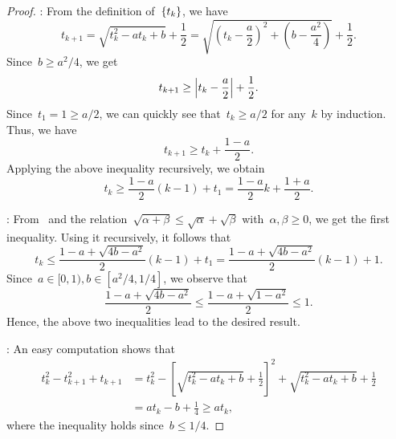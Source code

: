 \documentclass[../main]{subfiles}
\begin{document}
\begin{proof}
    :
    From the definition of~$\set{t_k}$, we have
    \begin{equation} \label{eq:t cs} 
        t_{k + 1} = \sqrt{t_k^2 - a t_k + b} + \frac{1}{2}
        = \sqrt{\left( t_k - \frac{a}{2} \right)^2 + \left( b - \frac{a^2}{4} \right)} + \frac{1}{2}
    .\end{equation}
    Since~$b \ge a^2 / 4$, we get
    \begin{equation}
        t_{k + 1} \ge \abs*{t_k - \frac{a}{2}} + \frac{1}{2}
    .\end{equation}
    Since~$t_1 = 1 \ge a / 2$, we can quickly see that~$t_k \ge a / 2$ for any~$k$ by induction.
    Thus, we have
    \begin{equation}
        t_{k + 1} \ge t_k + \frac{1 - a}{2}
    .\end{equation}
    Applying the above inequality recursively, we obtain
    \begin{equation}
        t_k \ge \frac{1 - a}{2} (k - 1) + t_1 = \frac{1 - a}{2} k + \frac{1 + a}{2}
    .\end{equation}

    :
    From~ and the relation~$\sqrt{\alpha + \beta} \le \sqrt{\alpha} + \sqrt{\beta}$ with~$\alpha, \beta \ge 0$, we get the first inequality.
    Using it recursively, it follows that
    \begin{equation}
        t_k \le \frac{1 - a + \sqrt{4 b - a^2}}{2} (k - 1) + t_1 = \frac{1 - a + \sqrt{4 b - a^2}}{2} (k - 1) + 1
    .\end{equation} 
    Since~$a \in [0, 1), b \in [a^2 / 4, 1 / 4]$, we observe that
    \begin{equation}
        \frac{1 - a + \sqrt{4 b - a^2}}{2} \le \frac{1 - a + \sqrt{1 - a^2}}{2} \le 1
    .\end{equation} 
    Hence, the above two inequalities lead to the desired result.

    :
    An easy computation shows that
    \begin{equation}
        \begin{split}
            t_k^2 - t_{k + 1}^2 + t_{k + 1} &= t_k^2 - \left[ \sqrt{t_k^2 - a t_k + b} + \frac{1}{2} \right]^2 + \sqrt{t_k^2 - a t_k + b} + \frac{1}{2} \\
                                            &= a t_k - b + \frac{1}{4} \ge a t_k
    ,\end{split}
    \end{equation} 
    where the inequality holds since~$b \le 1 / 4$.


\end{proof}
\end{document}

